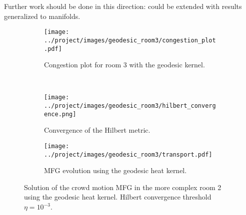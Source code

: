 \documentclass[11pt]{article}
\numberwithin{equation}{section}
\theoremstyle{definition}
\begin{document}
Further work should be done in this direction: \textcite{benamou2018entropy} could be extended with results generalized to manifolds.


\begin{figure}[h]
	\centering
	\begin{subfigure}[c]{.4\linewidth}
		\texttt{[image: ../project/images/geodesic\_room3/congestion\_plot.pdf]}
		\caption{Congestion plot for room 3 with the geodesic kernel.}
	\end{subfigure}~
	\begin{subfigure}[c]{.4\linewidth}
		\texttt{[image: ../project/images/geodesic\_room3/hilbert\_convergence.png]}
		\caption{Convergence of the Hilbert metric.}
	\end{subfigure}
	\begin{subfigure}[c]{.8\linewidth}
		\texttt{[image: ../project/images/geodesic\_room3/transport.pdf]}
		\caption{MFG evolution using the geodesic heat kernel.}
	\end{subfigure}
	\caption{Solution of the crowd motion MFG in the more complex room 2 using the geodesic heat kernel. Hilbert convergence threshold $\eta = 10^{-3}$.}\label{fig:GeodesicKernelRoom3Example}
\end{figure}



\printbibliography{}
\end{document}
